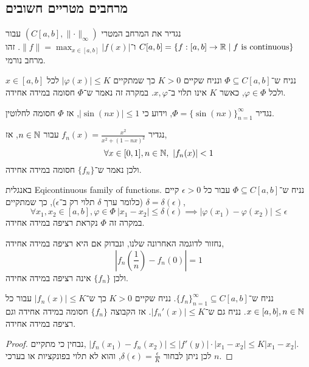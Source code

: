 \subsection{מרחבים מטריים חשובים}
\begin{definition}
	נגדיר את המרחב המטרי $(C[a, b], \lVert \cdot \rVert_\infty)$ עבור $C[a, b] = \{ f : [a, b] \to \mathbb{R} \mid f \text{ is continuous} \}$ ו־$\lVert f \rVert = \max_{x \in [a, b]} |f(x)|$.
	זהו מרחב נורמי.
\end{definition}
\begin{definition}
	נניח ש־$\Phi \subseteq C[a, b]$ ונניח שקיים $K > 0$ כך שמתקיים $|\varphi(x)| \le K$ לכל $x \in [a, b]$ ולכל $\varphi \in \Phi$, כאשר $K$ אינו תלוי ב־$x, \varphi$.
	במקרה זה נאמר ש־$\Phi$ חסומה במידה אחידה.
\end{definition}
\begin{example}
	נגדיר $\Phi = {\{ \sin(nx) \}}_{n = 1}^\infty$, וידוע כי $|\sin(nx)| \le 1$, אז $\Phi$ חסומה לחלוטין.
\end{example}
\begin{example}
	נגדיר $f_n(x) = \frac{x^2}{x^2 + {(1 - nx)}^2}$ עבור $n \in \mathbb{N}$, אז,
	\[
		\forall x \in [0, 1], n \in \mathbb{N},\ |f_n(x)| < 1
	\]
	ולכן נאמר ש־$\{ f_n \}$ חסומה במידה אחידה.
\end{example}
\begin{definition}
	באנגלית Eqicontinuous family of functions.
	נניח ש־$\Phi \subseteq C[a, b]$ עבור כל $\epsilon > 0$ קיים $\delta = \delta(\epsilon)$ (כלומר ערך $\delta$ תלוי רק ב־$\epsilon$), כך שמתקיים,
	\[
		\forall x_1, x_2 \in [a, b], \varphi \in \Phi\ 
		|x_1 - x_2| \le \delta(\epsilon)
		\implies |\varphi(x_1) - \varphi(x_2)| \le \epsilon
	\]
	במקרה זה $\Phi$ נקראת רציפה במידה אחידה.
\end{definition}
\begin{example}
	נחזור לדוגמה האחרונה שלנו, ונבדוק אם היא רציפה במידה אחידה,
	\[
		|f_n(\frac{1}{n}) - f_n(0)| = 1
	\]
	ולכן $\{ f_n \}$ אינה רציפה במידה אחידה.
\end{example}
\begin{proposition}
	נניח ש־${\{ f_n \}}_{n = 1}^\infty \subseteq C[a, b]$.
	נניח שקיים $K > 0$ כך ש־$|f_n(x)| \le K$ עבור כל $x \in [a, b], n \in \mathbb{N}$.
	נניח גם ש־$|f_n'(x)| \le K$.
	אז הקבוצה $\{ f_n \}$ חסומה במידה אחידה וגם רציפה במידה אחידה.
\end{proposition}
\begin{proof}
	נבחין כי מתקיים, $|f_n(x_1) - f_n(x_2)| \le |f'(y)| \cdot |x_1 - x_2| \le K |x_1 - x_2|$. \\
	לכן ניתן לבחור $\delta(\epsilon) = \frac{\epsilon}{K}$, והוא לא תלוי בפונקציות או בערכי $n$.
\end{proof}

